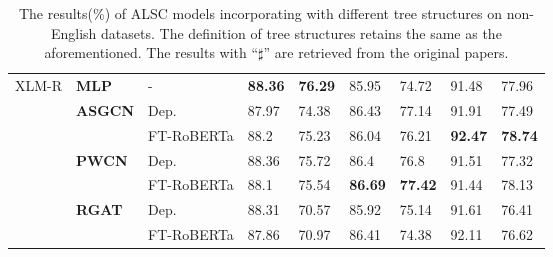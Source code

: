 \documentclass[11pt]{article}
\begin{document}
\begin{table*}[tp]
\begin{tabular}{m{3cm}m{3.3cm}m{2.5cm}m{1.15cm}<{\centering}m{1.15cm}<{\centering}m{1.15cm}<{\centering}m{1.15cm}<{\centering}m{1.15cm}<{\centering}m{1.15cm}<{\centering}}
    \midrule
    \multirow{7}{*}{XLM-R}            & \textbf{MLP}                  & -                               & \textbf{88.36}            & \textbf{76.29}             & 85.95                       & 74.72                    & 91.48                   & 77.96                 \\
                                      & \textbf{ASGCN     }           & Dep.                            & 87.97                     & 74.38                      & 86.43                       & 77.14                    & 91.91                   & 77.49                 \\
                                      &                               & FT-RoBERTa                      & 88.2                      & 75.23                      & 86.04                       & 76.21                    & \textbf{92.47}          & \textbf{78.74}        \\
                                      & \textbf{PWCN      }           & Dep.                            & 88.36                     & 75.72                      & 86.4                        & 76.8                     & 91.51                   & 77.32                 \\
                                      &                               & FT-RoBERTa                      & 88.1                      & 75.54                      & \textbf{86.69}              & \textbf{77.42}           & 91.44                   & 78.13                 \\
                                      & \textbf{RGAT      }           & Dep.                            & 88.31                     & 70.57                      & 85.92                       & 75.14                    & 91.61                   & 76.41                 \\
                                      &                               & FT-RoBERTa                      & 87.86                     & 70.97                      & 86.41                       & 74.38                    & 92.11                   & 76.62                 \\
    \bottomrule
  \end{tabular}
  \caption{The results(\%) of ALSC models incorporating with different tree structures on non-English datasets.  The definition of tree structures retains the same as the aforementioned.  The results with ``$\sharp$'' are retrieved from the original papers.}
  \label{tb:basenoeng}
\end{table*}
\end{document}

